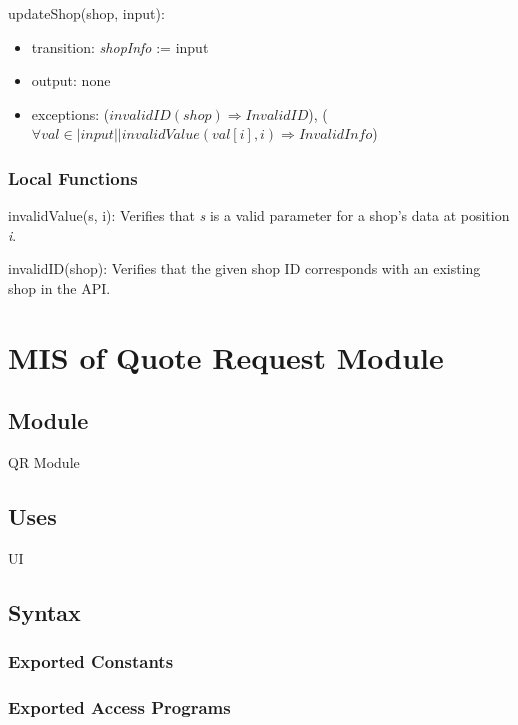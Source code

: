 \documentclass[12pt, titlepage]{article}
\begin{document}
\noindent updateShop(shop, input):
\begin{itemize}
\item transition: \textit{shopInfo} := input
\item output: none
\item exceptions: ($invalidID(shop) \Rightarrow InvalidID$), ($\forall val \in |input| | invalidValue(val[i], i) \Rightarrow InvalidInfo$)
\end{itemize}

\subsubsection{Local Functions}

\noindent invalidValue(s, i): Verifies that \textit{s} is a valid parameter for a shop's data at position \textit{i}.

\noindent invalidID(shop): Verifies that the given shop ID corresponds with an existing shop in the API.

\newpage

\section{MIS of Quote Request Module} \label{mQuoteRequest}

\subsection{Module}

QR Module

\subsection{Uses}

UI

\subsection{Syntax}

\subsubsection{Exported Constants}

\subsubsection{Exported Access Programs}
\end{document}

